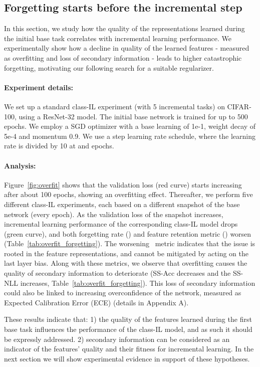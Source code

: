 \documentclass[final]{cvpr}
\newcommand{\cfr}{} \newcommand\todo[1]{(\textcolor{red}{TODO: #1})}
\begin{document}
\subsection{Forgetting starts before the incremental step}
\label{sec:overfitting}


In this section, we study how the quality of the representations learned during the initial base task correlates with incremental learning performance. 
We experimentally show how a decline in quality of the learned features - measured as overfitting and loss of secondary information - leads to higher catastrophic forgetting, motivating our following search for a suitable regularizer.

\paragraph{Experiment details:} We set up a standard class-IL experiment (with 5 incremental tasks) on CIFAR-100, using a ResNet-32 model.
The initial base network is trained for up to 500 epochs. We employ a SGD optimizer with a base learning of 1e-1, weight decay of 5e-4 and momentum 0.9. We use a step learning rate schedule, where the learning rate is divided by 10 at  and  epochs.

\paragraph{Analysis:} Figure~\ref{fig:overfit} shows that the validation loss (red curve) starts increasing after about 100 epochs, showing an overfitting effect.
Thereafter, we perform five different class-IL experiments, each based on a different snapshot of the base network (every  epoch).
As the validation loss of the snapshot increases, incremental learning performance of the corresponding class-IL model drops (green curve), and both forgetting rate () and feature retention metric (\cfr) worsen (Table~\ref{tab:overfit_forgetting}). The worsening \cfr~metric indicates that the issue is rooted in the feature representations, and cannot be mitigated by acting on the last layer bias.
Along with these metrics, we observe that overfitting causes the quality of secondary information to deteriorate (SS-Acc decreases and the SS-NLL increases, Table~\ref{tab:overfit_forgetting}).
This loss of secondary information could also be linked to increasing overconfidence of the network, measured as Expected Calibration Error (ECE) \cite{pmlr-v70-guo17a} (details in Appendix A).

These results indicate that: 
1) the quality of the features learned during the first base task influences the performance of the class-IL model, and as such it should be expressly addressed.
2) secondary information can be considered as an indicator of the features' quality and their fitness for incremental learning.
In the next section we will show experimental evidence in support of these hypotheses.
\end{document}
